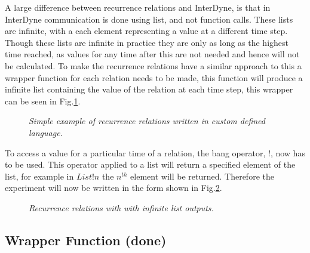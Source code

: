 \documentclass{article}
\begin{document}



A large difference between recurrence relations and InterDyne, is that in InterDyne communication is done using list, and not function calls. These lists are infinite, with a each element representing a value at a different time step. Though these lists are infinite in practice they are only as long as the highest time reached, as values for any time after this are not needed and hence will not be calculated. To make the recurrence relations have a similar approach to this a wrapper function for each relation needs to be made, this function will produce a infinite list containing the value of the relation at each time step, this wrapper can be seen in Fig.\ref{fig:iloc}. 
\begin{figure}[H]
	\centering
	
	\caption{\it Simple example of recurrence relations written in custom defined language.}
	\label{fig:iloc}
\end{figure} 
To access a value for a particular time of a relation, the bang operator, !, now has to be used. This operator applied to a list will return a specified element of the list, for example in $List!n$ the $n^{th}$ element will be returned. 
Therefore the experiment will now be written in the form shown in Fig.\ref{fig:RRiloc}. 
\begin{figure}[H]
	\centering
	
	\caption{\it Recurrence relations with with infinite list outputs.}
	\label{fig:RRiloc}
\end{figure} 
       
\subsection{Wrapper Function (done)}

\end{document}
